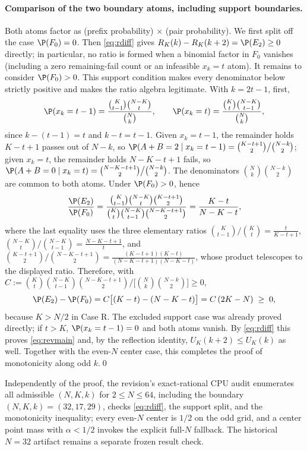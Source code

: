 \paragraph{Comparison of the two boundary atoms, including support boundaries.}
Both atoms factor as (prefix probability) $\times$ (pair probability).  We
first split off the case $\P(F_0)=0$.  Then \eqref{eq:rdiff} gives
$R_K(k)-R_K(k+2)=\P(E_2)\ge0$ directly; in particular, no ratio is formed
when a binomial factor in $F_0$ vanishes (including a zero remaining-fail
count or an infeasible $x_k=t$ atom).  It remains to consider
$\P(F_0)>0$.  This support condition makes every denominator below strictly
positive and makes the ratio algebra legitimate. With $k=2t-1$, first,
\[
\P(x_k=t-1)=\frac{\binom{K}{t-1}\binom{N-K}{t}}{\binom{N}{k}},
\qquad
\P(x_k=t)=\frac{\binom{K}{t}\binom{N-K}{t-1}}{\binom{N}{k}},
\]
since $k-(t-1)=t$ and $k-t=t-1$. Given $x_k=t-1$, the remainder holds
$K-t+1$ passes out of $N-k$, so
$\P(A+B=2\mid x_k=t-1)=\binom{K-t+1}{2}\big/\binom{N-k}{2}$; given $x_k=t$,
the remainder holds $N-K-t+1$ fails, so
$\P(A+B=0\mid x_k=t)=\binom{N-K-t+1}{2}\big/\binom{N-k}{2}$. The
denominators $\binom{N}{k}\binom{N-k}{2}$ are common to both atoms. Under
$\P(F_0)>0$, hence
\[
\frac{\P(E_2)}{\P(F_0)}
=\frac{\binom{K}{t-1}\binom{N-K}{t}\binom{K-t+1}{2}}
{\binom{K}{t}\binom{N-K}{t-1}\binom{N-K-t+1}{2}}
=\frac{K-t}{N-K-t},
\]
where the last equality uses the three elementary ratios
$\binom{K}{t-1}\big/\binom{K}{t}=\frac{t}{K-t+1}$,
$\binom{N-K}{t}\big/\binom{N-K}{t-1}=\frac{N-K-t+1}{t}$, and
$\binom{K-t+1}{2}\big/\binom{N-K-t+1}{2}=\frac{(K-t+1)(K-t)}{(N-K-t+1)(N-K-t)}$,
whose product telescopes to the displayed ratio. Therefore, with
$C:=\binom{K}{t}\binom{N-K}{t-1}\binom{N-K-t+1}{2}\big/
\big[\binom{N}{k}\binom{N-k}{2}\big]\ge 0$,
\begin{equation}
\label{eq:atomdiff}
\P(E_2)-\P(F_0)=C\big[(K-t)-(N-K-t)\big]=C\,(2K-N)\;\ge\;0,
\end{equation}
because $K>N/2$ in Case R.  The excluded support case was already proved
directly; if $t>K$, $\P(x_k=t-1)=0$ and both atoms vanish. By \eqref{eq:rdiff}
this proves \eqref{eq:revmain} and, by the
reflection identity, $U_K(k+2)\le U_K(k)$ as well. Together with the
even-$N$ center case, this completes the proof of monotonicity along odd
$k$.\qed

\begin{remark}[Verification at $N=32$]
Independently of the proof, the revision's exact-rational CPU audit enumerates
all admissible $(N,K,k)$ for $2\le N\le64$, including the boundary
$(N,K,k)=(32,17,29)$, checks \eqref{eq:rdiff}, the support split, and the
monotonicity inequality; every even-$N$ center is $1/2$ on the odd grid, and
a center point mass with $\alpha<1/2$ invokes the explicit full-$N$ fallback.
The historical $N=32$ artifact remains a separate frozen result check.
\end{remark}

